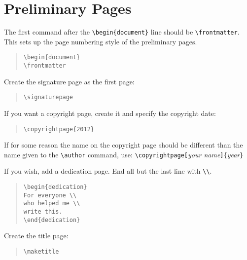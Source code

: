 \documentclass[doublespacing]{utdthesis}
\newenvironment{exampleclasscode}
 {\parindent=1cm\begin{verse}}
 {\end{verse}}
\begin{document}
\section{Preliminary Pages}
\label{s:prelim}

The first command after the \verb|\begin{document}| line should be
\verb|\frontmatter|.
This sets up the page numbering style of the preliminary pages.
\begin{exampleclasscode}
\verb|\begin{document}| \\
\verb|\frontmatter|
\end{exampleclasscode}

Create the signature page as the first page:
\begin{exampleclasscode}
\verb|\signaturepage|
\end{exampleclasscode}

If you want a copyright page, create it and specify the copyright date:
\begin{exampleclasscode}
\verb|\copyrightpage{2012}|
\end{exampleclasscode}
If for some reason the name on the copyright page should be different than
the name given to the \verb|\author| command, use:
\verb|\copyrightpage[|\textit{your name}\verb|]{|\textit{year}\verb|}|

If you wish, add a dedication page.
End all but the last line with \verb|\\|.
\begin{exampleclasscode}
\verb|\begin{dedication}| \\
\verb|For everyone \\| \\
\verb|who helped me \\| \\
\verb|write this.| \\
\verb|\end{dedication}|
\end{exampleclasscode}

Create the title page:
\begin{exampleclasscode}
\verb|\maketitle|
\end{exampleclasscode}
\end{document}
